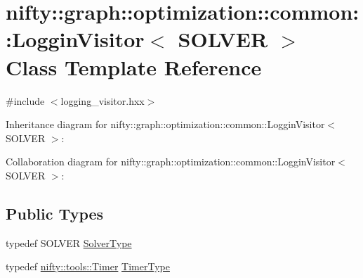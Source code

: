 \hypertarget{classnifty_1_1graph_1_1optimization_1_1common_1_1LogginVisitor}{}\section{nifty\+:\+:graph\+:\+:optimization\+:\+:common\+:\+:Loggin\+Visitor$<$ S\+O\+L\+V\+E\+R $>$ Class Template Reference}
\label{classnifty_1_1graph_1_1optimization_1_1common_1_1LogginVisitor}


{\ttfamily \#include $<$logging\+\_\+visitor.\+hxx$>$}



Inheritance diagram for nifty\+:\+:graph\+:\+:optimization\+:\+:common\+:\+:Loggin\+Visitor$<$ S\+O\+L\+V\+E\+R $>$\+:


Collaboration diagram for nifty\+:\+:graph\+:\+:optimization\+:\+:common\+:\+:Loggin\+Visitor$<$ S\+O\+L\+V\+E\+R $>$\+:
\subsection*{Public Types}
\begin{DoxyCompactItemize}
\item 
typedef S\+O\+L\+V\+E\+R \hyperlink{classnifty_1_1graph_1_1optimization_1_1common_1_1LogginVisitor_a1b8d6613cf8aeacf5fa4de64147a2ab2}{Solver\+Type}
\item 
typedef \hyperlink{classnifty_1_1tools_1_1Timer}{nifty\+::tools\+::\+Timer} \hyperlink{classnifty_1_1graph_1_1optimization_1_1common_1_1LogginVisitor_a55e7598e77340b97e04a2269464fa718}{Timer\+Type}
\end{DoxyCompactItemize}
